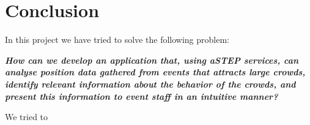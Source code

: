\chapter{Conclusion}\label{ch:conclusion}

In this project we have tried to solve the following problem:

\vspace{0.5 cm}
\begin{center}
	\textbf{\textit{How can we develop an application that, using aSTEP services, can analyse position data gathered from events that attracts large crowds, identify relevant information about the behavior of the crowds, and present this information to event staff in an intuitive manner?}}
\end{center}

We tried to 




